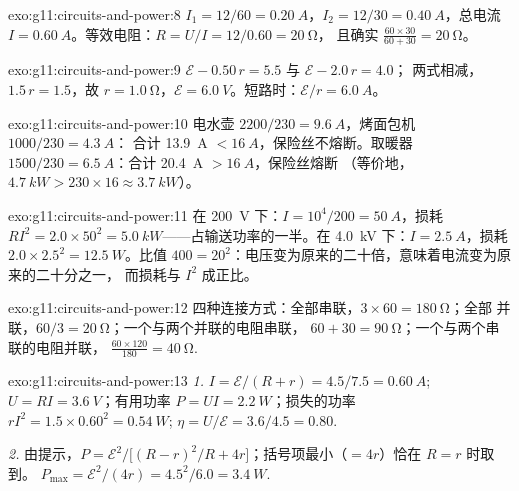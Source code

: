 \begin{solution}{exo:g11:circuits-and-power:8}
$I_1 = 12/60 = \qty{0.20}{A}$，$I_2 = 12/30 = \qty{0.40}{A}$，总电流
$I = \qty{0.60}{A}$。等效电阻：$R = U/I = 12/0.60 = \qty{20}{\ohm}$，
且确实 $\frac{60 \times 30}{60 + 30} = \qty{20}{\ohm}$。
\end{solution}

\begin{solution}{exo:g11:circuits-and-power:9}
$\mathcal{E} - 0.50\,r = 5.5$ 与 $\mathcal{E} - 2.0\,r = 4.0$；
两式相减，$1.5\,r = 1.5$，故 $r = \qty{1.0}{\ohm}$，$\mathcal{E} =
\qty{6.0}{V}$。短路时：$\mathcal{E}/r = \qty{6.0}{A}$。
\end{solution}

\begin{solution}{exo:g11:circuits-and-power:10}
电水壶 $2200/230 = \qty{9.6}{A}$，烤面包机 $1000/230 = \qty{4.3}{A}$：
合计 \qty{13.9}{A} $< \qty{16}{A}$，保险丝不熔断。取暖器 $1500/230 =
\qty{6.5}{A}$：合计 \qty{20.4}{A} $> \qty{16}{A}$，保险丝熔断
（等价地，$\qty{4.7}{kW} > 230 \times 16 \approx \qty{3.7}{kW}$）。
\end{solution}

\begin{solution}{exo:g11:circuits-and-power:11}
在 \qty{200}{V} 下：$I = 10^4/200 = \qty{50}{A}$，损耗 $RI^2 = 2.0 \times
50^2 = \qty{5.0}{kW}$——占输送功率的一半。在 \qty{4.0}{kV} 下：$I =
\qty{2.5}{A}$，损耗 $2.0 \times 2.5^2 = \qty{12.5}{W}$。比值 $400 =
20^2$：电压变为原来的二十倍，意味着电流变为原来的二十分之一，
而损耗与 $I^2$ 成正比。
\end{solution}

\begin{solution}{exo:g11:circuits-and-power:12}
四种连接方式：全部串联，$3 \times 60 = \qty{180}{\ohm}$；全部
并联，$60/3 = \qty{20}{\ohm}$；一个与两个并联的电阻串联，
$60 + 30 = \qty{90}{\ohm}$；一个与两个串联的电阻并联，
$\frac{60 \times 120}{180} = \qty{40}{\ohm}$.
\end{solution}

\begin{solution}{exo:g11:circuits-and-power:13}
\emph{1.} $I = \mathcal{E}/(R + r) = 4.5/7.5 = \qty{0.60}{A}$;
$U = RI = \qty{3.6}{V}$；有用功率 $P = UI = \qty{2.2}{W}$；损失的功率 $rI^2 =
1.5 \times 0.60^2 = \qty{0.54}{W}$; $\eta = U/\mathcal{E} = 3.6/4.5 =
0.80$.

\emph{2.} 由提示，$P = \mathcal{E}^2 \big/ \big[(R - r)^2/R +
4r\big]$；括号项最小（$= 4r$）恰在 $R = r$ 时取到。
$P_{\max} = \mathcal{E}^2/(4r) = 4.5^2/6.0 = \qty{3.4}{W}$.
\end{solution}

